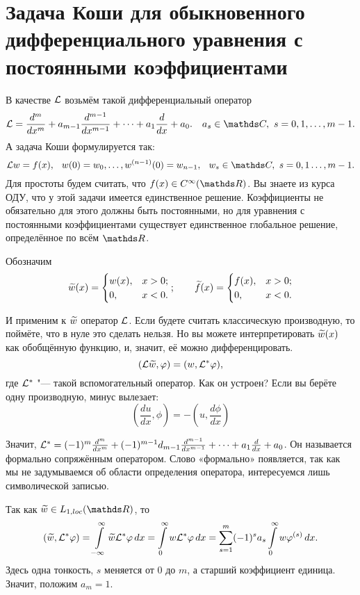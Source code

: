 \section{Задача Коши для обыкновенного дифференциального уравнения с постоянными коэффициентами}
В качестве $\mathcal L$ возьмём такой дифференциальный оператор
\[
 \L = \frac{d^m}{dx^m} + a_{m-1}\frac{d^{m-1}}{dx^{m-1}}+\dots+a_1\frac d{dx}+a_0.\quad a_s\in\C,\ s=0,1,\dots,m-1.
\]
А задача Коши формулируется так:
\[
  \L w = f(x),\pau w(0)=w_0,\dots, w^{(n-1)}(0) = w_{n-1},\pau w_s\in \C,\ s=0,1\dots,m-1.
\]
Для простоты будем считать, что $f(x)\in C^\infty(\R)$. Вы знаете из курса ОДУ, что у этой задачи имеется единственное решение. Коэффициенты не обязательно для этого должны быть постоянными, но для уравнения с постоянными коэффициентами существует единственное глобальное решение, определённое по всём $\R$.

Обозначим 
\[\widetilde{w}{}(x) = \begin{cases}
  w(x),&x>0;\\ 0,&x<0.
\end{cases};\qquad\widetilde{f}{}(x) = \begin{cases}
  f(x),&x>0;\\
  0,&x<0.
\end{cases}
\]

И применим к $\widetilde{w}{}$ оператор $\mathcal L$. Если будете считать классическую производную, то поймёте, что в нуле это сделать нельзя. Но вы можете интерпретировать $\widetilde{w}{}(x)$ как обобщённую функцию, и, значит, её можно дифференцировать.
\[
  (\mathcal L\widetilde{w}{},\varphi) = (w,\mathcal L^*\varphi),
\]
где $\mathcal L^*$ "--- такой вспомогательный оператор. Как он устроен? Если вы берёте одну производную, минус вылезает:
\[
  \left(\frac{du}{dx},\phi\right) = -\left(u,\frac{d\phi}{dx}\right)
\]

Значит, $\mathcal L^* = (-1)^m\frac{d^m}{dx^m}+ (-1)^{m-1}d_{m-1}\frac{d^{m-1}}{dx^{m-1}}+\dots+a_1\frac{d}{dx}+a_0$. Он называется формально сопряжённым оператором. Слово «формально» появляется, так как мы не задумываемся об области определения оператора, интересуемся лишь символической записью.

Так как $\Til w\in L_{1,loc}(\R)$, то 
\begin{equation}\label{vsesuda1}
  (\widetilde{w}{},\mathcal L^*\varphi) = \int\limits_{-\infty}^\infty\widetilde{w}{}\mathcal L^*\varphi\,dx = 
  \int\limits_0^\infty w\mathcal L^*\varphi\,dx = 
  \sum\limits_{s = 1}^{m} (-1)^s a_s\int\limits_0^\infty w\varphi^{(s)}\,dx.
\end{equation}
Здесь одна тонкость, $s$ меняется от $0$ до $m$, а старший коэффициент единица. Значит, положим $a_m=1$.

